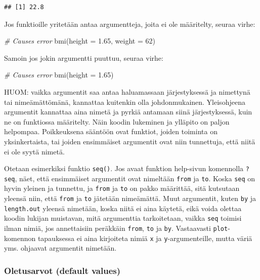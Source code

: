 \documentclass[
]{book}
\newenvironment{Shaded}{\begin{snugshade}}{\end{snugshade}}
\newcommand{\AttributeTok}[1]{\textcolor[rgb]{0.77,0.63,0.00}{#1}}
\newcommand{\CommentTok}[1]{\textcolor[rgb]{0.56,0.35,0.01}{\textit{#1}}}
\newcommand{\DecValTok}[1]{\textcolor[rgb]{0.00,0.00,0.81}{#1}}
\newcommand{\FloatTok}[1]{\textcolor[rgb]{0.00,0.00,0.81}{#1}}
\newcommand{\FunctionTok}[1]{\textcolor[rgb]{0.00,0.00,0.00}{#1}}
\newcommand{\NormalTok}[1]{#1}
\begin{document}
\begin{verbatim}
## [1] 22.8
\end{verbatim}

Jos funktioille yritetään antaa argumentteja, joita ei ole määritelty, seuraa virhe:

\begin{Shaded}
\begin{Highlighting}[]
\CommentTok{\# Causes error}
\FunctionTok{bmi}\NormalTok{(}\AttributeTok{height =} \FloatTok{1.65}\NormalTok{, }\AttributeTok{weight =} \DecValTok{62}\NormalTok{)}
\end{Highlighting}
\end{Shaded}

Samoin jos jokin argumentti puuttuu, seuraa virhe:

\begin{Shaded}
\begin{Highlighting}[]
\CommentTok{\# Causes error}
\FunctionTok{bmi}\NormalTok{(}\AttributeTok{height =} \FloatTok{1.65}\NormalTok{)}
\end{Highlighting}
\end{Shaded}

HUOM: vaikka argumentit saa antaa haluamassaan järjestyksessä ja nimettynä tai nimeämättömänä, kannattaa kuitenkin olla johdonmukainen. Yleisohjeena argumentit kannattaa aina nimetä ja pyrkiä antamaan siinä järjestyksessä, kuin ne on funktiossa määritelty. Näin koodin lukeminen ja ylläpito on paljon helpompaa. Poikkeuksena sääntöön ovat funktiot, joiden toiminta on yksinkertaista, tai joiden ensimmäiset argumentit ovat niin tunnettuja, että niitä ei ole syytä nimetä.

Otetaan esimerkiksi funktio \texttt{seq()}. Jos avaat funktion help-sivun komennolla \texttt{?seq}, näet, että ensimmäiset argumentit ovat nimeltään \texttt{from} ja \texttt{to}. Koska \texttt{seq} on hyvin yleinen ja tunnettu, ja \texttt{from} ja \texttt{to} on pakko määrittää, sitä kutsutaan yleensä niin, että \texttt{from} ja \texttt{to} jätetään nimeämättä. Muut argumentit, kuten \texttt{by} ja \texttt{length.out} yleensä nimetään, koska niitä ei aina käytetä, eikä voida olettaa koodin lukijan muistavan, mitä argumenttia tarkoitetaan, vaikka \texttt{seq} toimisi ilman nimiä, jos annettaisiin peräkkäin \texttt{from}, \texttt{to} ja \texttt{by}. Vastaavasti \texttt{plot}-komennon tapauksessa ei aina kirjoiteta nimiä \texttt{x} ja \texttt{y}-argumenteille, mutta väriä yms. ohjaavat argumentit nimetään.

\hypertarget{oletusarvot-default-values}{%
\subsubsection{Oletusarvot (default values)}\label{oletusarvot-default-values}}
\end{document}
